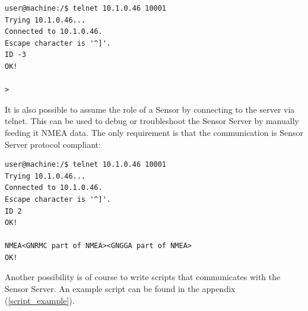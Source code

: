 \documentclass[12pt,english,a4paper]{report}
\begin{document}
\begin{lstlisting}
user@machine:/$ telnet 10.1.0.46 10001
Trying 10.1.0.46...
Connected to 10.1.0.46.
Escape character is '^]'.
ID -3
OK!

>
\end{lstlisting}
It is also possible to assume the role of a Sensor by connecting to the server via telnet. This can be used to debug or troubleshoot the Sensor Server by manually feeding it NMEA data. The only requirement is that the communication is Sensor Server protocol compliant:

\begin{lstlisting}
user@machine:/$ telnet 10.1.0.46 10001
Trying 10.1.0.46...
Connected to 10.1.0.46.
Escape character is '^]'.
ID 2
OK!

NMEA<GNRMC part of NMEA><GNGGA part of NMEA>
OK!
\end{lstlisting}
Another possibility is of course to write scripts that communicates with the Sensor Server. An example script can be found in the appendix (\ref{script_example}).
\end{document}
